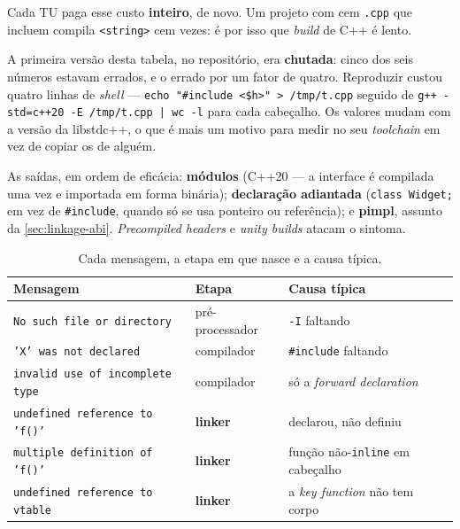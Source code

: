Cada TU paga esse custo \textbf{inteiro}, de novo. Um projeto com cem
\texttt{.cpp} que incluem  compila \texttt{<string>} cem
vezes: é por isso que \emph{build} de C++ é lento.

\begin{regra}
A primeira versão desta tabela, no repositório, era \textbf{chutada}: cinco dos
seis números estavam errados, e o  errado por um fator de
quatro. Reproduzir custou quatro linhas de \emph{shell} ---
\texttt{echo "\#include <\$h>" > /tmp/t.cpp} seguido de
\texttt{g++ -std=c++20 -E /tmp/t.cpp | wc -l} para cada cabeçalho. Os valores
mudam com a versão da libstdc++, o que é mais um motivo para medir no seu
\emph{toolchain} em vez de copiar os de alguém.
\end{regra}

As saídas, em ordem de eficácia: \textbf{módulos} (C++20 --- a interface é
compilada uma vez e importada em forma binária); \textbf{declaração adiantada}
(\texttt{class Widget;} em vez de \texttt{\#include}, quando só se usa ponteiro
ou referência); e \textbf{pimpl}, assunto da \cref{sec:linkage-abi}.
\emph{Precompiled headers} e \emph{unity builds} atacam o sintoma.

\begin{table}[htbp]
\centering
\caption{Cada mensagem, a etapa em que nasce e a causa típica.}
\label{tab:erros-etapa}
\footnotesize
\begin{tabular}{@{}lll@{}}
\toprule
\textbf{Mensagem} & \textbf{Etapa} & \textbf{Causa típica} \\
\midrule
\texttt{No such file or directory}     & pré-processador & \texttt{-I} faltando \\
\texttt{'X' was not declared}          & compilador & \texttt{\#include} faltando \\
\texttt{invalid use of incomplete type}& compilador & só a \emph{forward declaration} \\
\texttt{undefined reference to 'f()'}  & \textbf{linker} & declarou, não definiu \\
\texttt{multiple definition of 'f()'}  & \textbf{linker} & função não-\texttt{inline}
                                                           em cabeçalho \\
\texttt{undefined reference to vtable} & \textbf{linker} & a \emph{key function}
                                                           não tem corpo \\
\bottomrule
\end{tabular}
\end{table}

